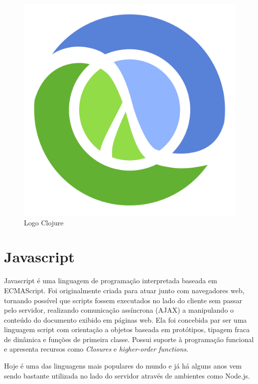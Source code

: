 	\begin{figure}
	    \centering
	    \includegraphics[scale=0.1]{pictures/clojure_logo.png}
	    \caption{Logo Clojure}
	    \label{fig:logo_clojure}
	\end{figure}
	
	\section{Javascript} %
	Javascript é uma linguagem de programação interpretada baseada em ECMAScript. Foi originalmente criada para atuar junto com navegadores web, tornando possível que scripts fossem executados no lado do cliente sem passar pelo servidor, realizando comunicação assíncrona (AJAX) a manipulando o conteúdo do documento exibido em páginas web.
	Ela foi concebida par ser uma linguagem script com orientação a objetos baseada em protótipos, tipagem fraca de dinâmica e funções de primeira classe. Possui suporte à programação funcional e apresenta recursos como \textit{Closures} e \textit{higher-order functions}.
	
	Hoje é uma das linguagens mais populares do mundo e já há alguns anos vem sendo bastante utilizada no lado do servidor através de ambientes como Node.js. 
	
